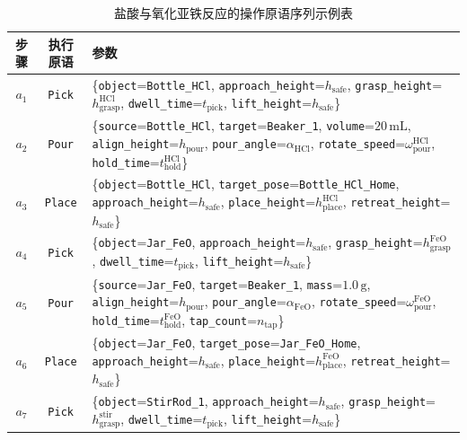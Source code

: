 \begin{table}[htbp]
\centering
\caption{盐酸与氧化亚铁反应的操作原语序列示例表}
\label{tab:hcl_feo_atomic_actions}
\small
\begin{tabular}{c c p{10.4cm}}
\toprule
步骤 & 执行原语 & 参数 \\
\midrule
$a_1$ & \texttt{Pick} &
\{\texttt{object}=\texttt{Bottle\_HCl}, \texttt{approach\_height}=$h_{\mathrm{safe}}$, \texttt{grasp\_height}=$h_{\mathrm{grasp}}^{\mathrm{HCl}}$, \texttt{dwell\_time}=$t_{\mathrm{pick}}$, \texttt{lift\_height}=$h_{\mathrm{safe}}$\} \\

$a_2$ & \texttt{Pour} &
\{\texttt{source}=\texttt{Bottle\_HCl}, \texttt{target}=\texttt{Beaker\_1}, \texttt{volume}=$20\,\mathrm{mL}$, \texttt{align\_height}=$h_{\mathrm{pour}}$, \texttt{pour\_angle}=$\alpha_{\mathrm{HCl}}$, \texttt{rotate\_speed}=$\omega_{\mathrm{pour}}^{\mathrm{HCl}}$, \texttt{hold\_time}=$t_{\mathrm{hold}}^{\mathrm{HCl}}$\} \\

$a_3$ & \texttt{Place} &
\{\texttt{object}=\texttt{Bottle\_HCl}, \texttt{target\_pose}=\texttt{Bottle\_HCl\_Home}, \texttt{approach\_height}=$h_{\mathrm{safe}}$, \texttt{place\_height}=$h_{\mathrm{place}}^{\mathrm{HCl}}$, \texttt{retreat\_height}=$h_{\mathrm{safe}}$\} \\

$a_4$ & \texttt{Pick} &
\{\texttt{object}=\texttt{Jar\_FeO}, \texttt{approach\_height}=$h_{\mathrm{safe}}$, \texttt{grasp\_height}=$h_{\mathrm{grasp}}^{\mathrm{FeO}}$, \texttt{dwell\_time}=$t_{\mathrm{pick}}$, \texttt{lift\_height}=$h_{\mathrm{safe}}$\} \\

$a_5$ & \texttt{Pour} &
\{\texttt{source}=\texttt{Jar\_FeO}, \texttt{target}=\texttt{Beaker\_1}, \texttt{mass}=$1.0\,\mathrm{g}$, \texttt{align\_height}=$h_{\mathrm{pour}}$, \texttt{pour\_angle}=$\alpha_{\mathrm{FeO}}$, \texttt{rotate\_speed}=$\omega_{\mathrm{pour}}^{\mathrm{FeO}}$, \texttt{hold\_time}=$t_{\mathrm{hold}}^{\mathrm{FeO}}$, \texttt{tap\_count}=$n_{\mathrm{tap}}$\} \\

$a_6$ & \texttt{Place} &
\{\texttt{object}=\texttt{Jar\_FeO}, \texttt{target\_pose}=\texttt{Jar\_FeO\_Home}, \texttt{approach\_height}=$h_{\mathrm{safe}}$, \texttt{place\_height}=$h_{\mathrm{place}}^{\mathrm{FeO}}$, \texttt{retreat\_height}=$h_{\mathrm{safe}}$\} \\

$a_7$ & \texttt{Pick} &
\{\texttt{object}=\texttt{StirRod\_1}, \texttt{approach\_height}=$h_{\mathrm{safe}}$, \texttt{grasp\_height}=$h_{\mathrm{grasp}}^{\mathrm{stir}}$, \texttt{dwell\_time}=$t_{\mathrm{pick}}$, \texttt{lift\_height}=$h_{\mathrm{safe}}$\} \\


\end{tabular}
\end{table}
